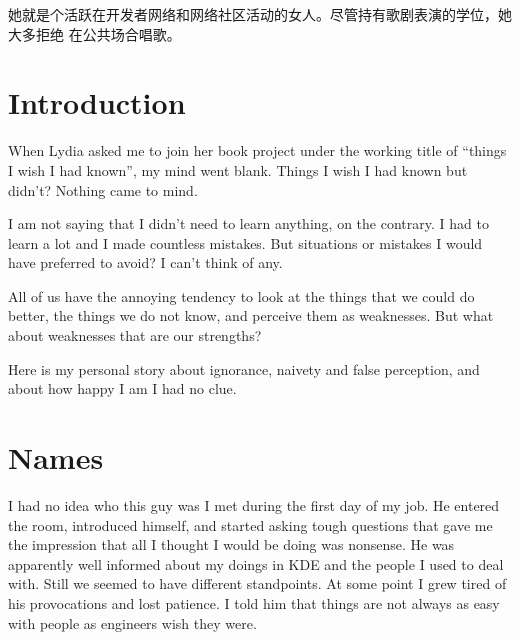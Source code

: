 
她就是个活跃在开发者网络和网络社区活动的女人。尽管持有歌剧表演的学位，她大多拒绝
在公共场合唱歌。
\section*{Introduction}

When Lydia asked me to join her book project under the working title of ``things
I wish I had known'', my mind went blank. Things I wish I had known but didn't?
Nothing came to mind.

I am not saying that I didn't need to learn anything, on the contrary. I had to
learn a lot and I made countless mistakes. But situations or mistakes I would
have preferred to avoid? I can't think of any.

All of us have the annoying tendency to look at the things that we could do
better, the things we do not know, and perceive them as weaknesses. But what
about weaknesses that are our strengths?

Here is my personal story about ignorance, naivety and false perception, and
about how happy I am I had no clue.

\section*{Names}

I had no idea who this guy was I met during the first day of my job. He entered
the room, introduced himself, and started asking tough questions that gave me
the impression that all I thought I would be doing was nonsense. He was
apparently well informed about my doings in KDE and the people I used to deal
with. Still we seemed to have different standpoints. At some point I grew tired
of his provocations and lost patience. I told him that things are not always as
easy with people as engineers wish they were.


